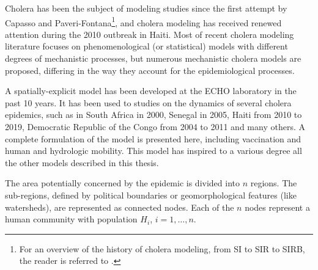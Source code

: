 Cholera has been the subject of modeling studies since the first attempt by Capasso and Paveri-Fontana\cite[-4\baselineskip]{Capasso:MathematicalModel1973:1979}\footnote[][-1\baselineskip]{For an overview of the history of cholera modeling, from SI to SIR to SIRB, the reader is referred to .}, and cholera modeling has received renewed attention during the 2010 outbreak in Haiti. Most of recent cholera modeling literature focuses on phenomenological (or statistical) models with different degrees of mechanistic processes, but numerous mechanistic cholera models are proposed, differing in the way they account for the epidemiological processes. %


A spatially-explicit model has been developed at the ECHO laboratory in the past 10 years\cite{Bertuzzo:SpacetimeEvolutionCholera:2008}. It has been used to studies on the dynamics of several cholera epidemics, such as in South Africa in 2000\cite{Mari:ModellingCholeraEpidemics:2012}, Senegal in 2005, Haiti from 2010 to 2019\cite{Bertuzzo:PredictionSpatialEvolution:2011,Bertuzzo:ProbabilityExtinctionHaiti:2016}, Democratic Republic of the Congo from 2004 to 2011 and many others\cite{Finger:PotentialImpactCasearea:2018}.  
A complete formulation of the model is presented here, including vaccination and human and hydrologic mobility\cite{Bertuzzo:ProbabilityExtinctionHaiti:2016,Pasetto:RealtimeForecastingCholera:2018}. This model has inspired to a various degree all the other models described in this thesis.

The area potentially concerned by the epidemic is divided into $n$ regions. The sub-regions, defined by political boundaries or geomorphological features (like watersheds\cite{Bertuzzo:ProbabilityExtinctionHaiti:2016}), are represented as connected nodes. Each of the $n$ nodes represent a human community with population $H_i$, $i=1,\dots, n$. 

